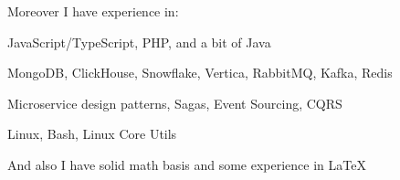 Moreover I have experience in:
\begin{bulist}
  \item JavaScript/TypeScript, PHP, and a bit of Java
  \item MongoDB, ClickHouse, Snowflake, Vertica, RabbitMQ, Kafka, Redis
  \item Microservice design patterns, Sagas, Event Sourcing, CQRS
  \item Linux, Bash, Linux Core Utils
\end{bulist}
And also I have solid math basis and some experience in \LaTeX

